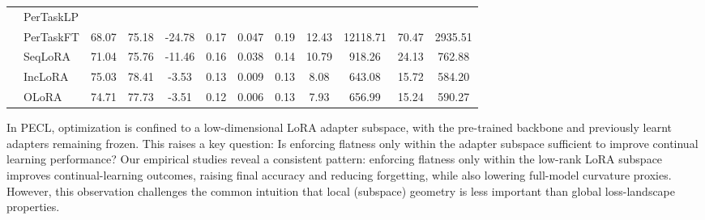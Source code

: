 \documentclass{article} %
\begin{document}
\begin{table}[t]
{\begin{tabular}{l l ccc cccccc c}
& PerTaskLP       \\
& PerTaskFT        &68.07  &75.18  &-24.78  &0.17    &0.047  &0.19  &12.43 &12118.71 &70.47 &2935.51 \\
\cmidrule(lr){2-12}
& SeqLoRA        &71.04  &75.76  &-11.46  &0.16  &0.038 &0.14  &10.79  &918.26  &24.13 &762.88\\
\cmidrule(lr){2-12}
 & IncLoRA        &75.03  &78.41  &-3.53  &0.13  &0.009 &0.13  &8.08  &643.08  &15.72 &584.20\\
 \cmidrule(lr){2-12}
 & OLoRA          &74.71  &77.73  &-3.51  &0.12  &0.006  &0.13  &7.93  &656.99 &15.24 &590.27\\
\bottomrule
\end{tabular}
}
\end{table}



In PECL, optimization is confined to a low-dimensional LoRA adapter subspace, with the pre-trained backbone and previously learnt adapters remaining frozen. This raises a key question: Is enforcing flatness only within the adapter subspace sufficient to improve continual learning performance? Our empirical studies reveal a consistent pattern: enforcing flatness only within the low-rank LoRA subspace improves continual-learning outcomes, raising final accuracy and reducing forgetting, while also lowering full-model curvature proxies. However,  this observation challenges the common intuition that local (subspace) geometry is less important than global loss-landscape properties.


 
\end{document}
